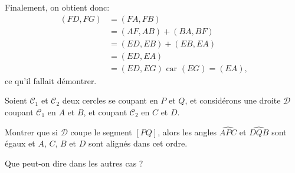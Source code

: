 \begin{exo}[Pentagramme]
\begin{sol}
Finalement, on obtient donc:
\begin{align*}
(FD,FG)&=(FA,FB) \\
&= (AF,AB)+(BA,BF) \\
&= (ED,EB) + (EB,EA)\\
&= (ED,EA)\\
&= (ED,EG) \text{ car $(EG)=(EA)$,}
\end{align*}
ce qu'il fallait démontrer.


\end{sol}
\end{exo}


\begin{exo}

Soient $\mathcal C_1$ et $\mathcal C_2$ deux cercles se coupant en $P$ et $Q$, et considérons une droite $\mathcal D$ coupant $\mathcal C_1$ en $A$ et $B$, et coupant $\mathcal C_2$ en  $C$ et $D$. 

Montrer que si $\mathcal D$ coupe le segment $[PQ]$, alors les angles $\widehat{APC}$ et $\widehat{DQB}$ sont égaux  et $A$, $C$, $B$ et $D$ sont alignés dans cet ordre.

Que peut-on dire dans les autres cas ?


\end{exo}
